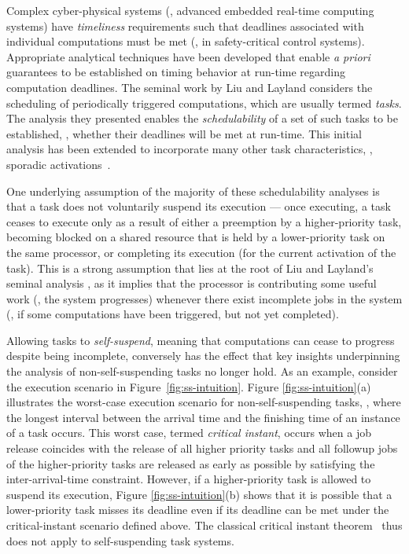 \label{sec:intro}

Complex cyber-physical systems (\ie, advanced embedded real-time computing systems) have \emph{timeliness} requirements %
such that  deadlines associated with individual computations must be met (\eg, in safety-critical control systems). Appropriate analytical techniques have been developed that enable \emph{a priori} guarantees to be established on timing behavior at run-time regarding computation deadlines.  
The seminal work by Liu and Layland \cite{Liu_1973} considers the scheduling of periodically triggered computations, which are usually termed \emph{tasks}. 
The analysis they presented enables the \emph{schedulability} of a set of such tasks to be established, \ie, whether their deadlines will be met at run-time. This initial analysis has been extended to incorporate many other task characteristics, \eg, sporadic activations~\cite{Mok:1983:FDP:888951}. 

One underlying assumption of the majority of these schedulability analyses is that a task does not voluntarily suspend its execution --- once executing, a task ceases to execute only as a result of either a preemption by a higher-priority task, becoming blocked on a shared resource that is held by a lower-priority task on the same processor, or completing its execution (for the current activation of the task). This is a strong assumption that lies at the root of Liu and Layland's seminal analysis \cite{Liu_1973}, as it implies that the processor is contributing some useful work (\ie, the system progresses) whenever there exist incomplete jobs in the system (\ie, if some computations have been triggered, but not yet completed). 

Allowing tasks to \emph{self-suspend}, meaning that computations can cease to progress despite being incomplete, conversely has the effect that key insights underpinning the analysis of non-self-suspending tasks no longer hold. As an example, consider the execution scenario in Figure~\ref{fig:ss-intuition}. Figure \ref{fig:ss-intuition}(a) illustrates the worst-case execution scenario for non-self-suspending tasks, \ie, where the longest interval between the arrival time and the finishing time of an instance of a task occurs. This worst case, termed \emph{critical instant}, occurs when a job release coincides with the release of all higher priority tasks and all followup jobs of the higher-priority tasks are released as early as possible by satisfying the inter-arrival-time constraint. However, if a higher-priority task is allowed to suspend its execution, Figure \ref{fig:ss-intuition}(b) shows that it is possible that a lower-priority task misses its deadline even if its deadline can be met under the critical-instant scenario defined above. The classical critical instant theorem~\cite{Liu_1973} thus does not apply to self-suspending task systems.


